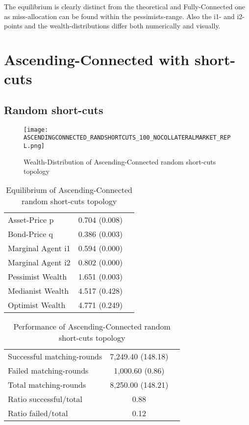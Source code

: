 \documentclass[Bachelorarbeit.tex]{subfiles}
\begin{document}
The equilibrium is clearly distinct from the theoretical and Fully-Connected one as miss-allocation can be found within the pessimists-range. Also the i1- and i2-points and the wealth-distributions differ both numerically and visually. 

\section{Ascending-Connected with short-cuts}
\label{app:results_acShortCuts}

\subsection{Random short-cuts}
\begin{figure}[H]
	\centering
  \texttt{[image: ASCENDINGCONNECTED\_RANDSHORTCUTS\_100\_NOCOLLATERALMARKET\_REPL.png]}
	\caption{Wealth-Distribution of Ascending-Connected random short-cuts topology}
	\label{fig:wealth_ASCENDINGCONNECTED_RANDSHORTCUTS_100_NOCOLLATERALMARKET_REPL}
\end{figure}

\begin{table}[H]
	\caption{Equilibrium of Ascending-Connected random short-cuts topology}
	\centering
	\begin{tabular} { l c r }
		\hline
		Asset-Price p & 0.704 (0.008) \\
		Bond-Price q & 0.386 (0.003) \\
		Marginal Agent i1 & 0.594 (0.000) \\
		Marginal Agent i2 & 0.802 (0.000) \\
		\hline
		Pessimist Wealth & 1.651 (0.003) \\
		Medianist Wealth & 4.517 (0.428) \\
		Optimist Wealth & 4.771 (0.249) \\
		\hline
	\end{tabular}
\end{table} 

\begin{table}[H]
	\caption{Performance of Ascending-Connected random short-cuts topology}
	\centering
	\begin{tabular} { l c r }
		\hline
		Successful matching-rounds & 7,249.40 (148.18) \\
		Failed matching-rounds & 1,000.60 (0.86) \\
		Total matching-rounds & 8,250.00 (148.21) \\
		\hline
		Ratio successful/total & 0.88 \\
		Ratio failed/total & 0.12 \\
		\hline
	\end{tabular}
\end{table}
\end{document}
